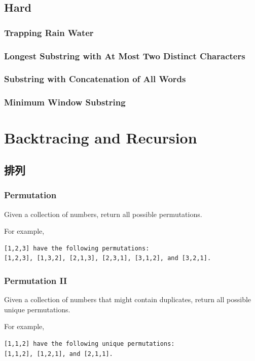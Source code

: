\documentclass[12pt]{book}
\begin{document}
\section{Hard}
\label{sec-15-3}
\subsection{Trapping Rain Water}
\label{sec-15-3-1}
\subsection{Longest Substring with At Most Two Distinct Characters}
\label{sec-15-3-2}
\subsection{Substring with Concatenation of All Words}
\label{sec-15-3-3}
\subsection{Minimum Window Substring}
\label{sec-15-3-4}
\chapter{Backtracing and Recursion}
\label{sec-16}
\section{排列}
\label{sec-16-1}
\subsection{Permutation}
\label{sec-16-1-1}
Given a collection of numbers, return all possible permutations.

For example,
\lstset{language=java,label= ,caption= ,numbers=none}
\begin{lstlisting}
[1,2,3] have the following permutations:
[1,2,3], [1,3,2], [2,1,3], [2,3,1], [3,1,2], and [3,2,1].
\end{lstlisting}
\subsection{Permutation II}
\label{sec-16-1-2}
Given a collection of numbers that might contain duplicates, return all possible unique permutations.

For example,
\lstset{language=java,label= ,caption= ,numbers=none}
\begin{lstlisting}
[1,1,2] have the following unique permutations:
[1,1,2], [1,2,1], and [2,1,1].
\end{lstlisting}
\end{document}
